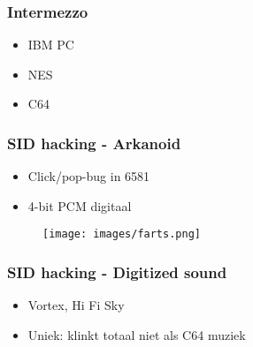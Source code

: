 
\begin{frame}
\frametitle{Intermezzo}

\begin{itemize}
\item IBM PC
\item NES
\item C64
\end{itemize}

\end{frame}


\begin{frame}
\frametitle{SID hacking - Arkanoid}

\begin{itemize}
\item Click/pop-bug in 6581
\item 4-bit PCM digitaal
\end{itemize}

\begin{figure}
\texttt{[image: images/farts.png]}
\end{figure}

\end{frame}


\begin{frame}
\frametitle{SID hacking - Digitized sound}

\begin{itemize}
\item Vortex, Hi Fi Sky
\item Uniek: klinkt totaal niet als C64 muziek
\end{itemize} 

\end{frame}
